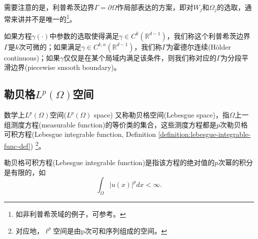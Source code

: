 需要注意的是，利普希茨边界$\Gamma = \partial \Omega$作局部表达的方案，即对$W_j$和$\Omega_j$的选取，通常来讲并不是唯一的\footnote{如非利普希茨域的例子，可参考\cite{McLean:2000ta}。}。

如果方程$\gamma(\cdot)$中参数的选取使得满足$\gamma \in C^{k}(\mathbb{R}^{d-1})$，我们称这个利普希茨边界$\Gamma$是$k$次可微的；如果满足$\gamma \in C^{k, \kappa}(\mathbb{R}^{d-1})$，我们称$\Gamma$为霍德尔连续(Hölder continuous)；如果$\gamma$仅仅是在某个局域内满足该条件，则我们称对应的$\Gamma$为分段平滑边界(piecewise smooth boundary)。

\subsection{勒贝格\texorpdfstring{$L^p(\Omega)$}{(LP)}空间}

数学上$L^{p}(\Omega)$空间($L^{p}(\Omega)$ space) 又称勒贝格空间(Lebesgue space)，指$\Omega$上一组测度方程(measurable function)的等价类的集合，这些测度方程都是$p$次勒贝格可积方程(Lebesgue integrable function, Definition \ref{definition:lebesgue-integrable-func-def}) \footnote{对应地，$\ell^p$空间是由p次可和序列组成的空间。}。

\begin{definition}[勒贝格可积方程]
  \label{definition:lebesgue-integrable-func-def}
  勒贝格可积方程(Lebesgue integrable function)是指该方程的绝对值的$p$次幂的积分是有限的，如
  \begin{equation*}
    \int_{\Omega} \left| u(x) \right|^p d x < \infty.
  \end{equation*}
\end{definition}

